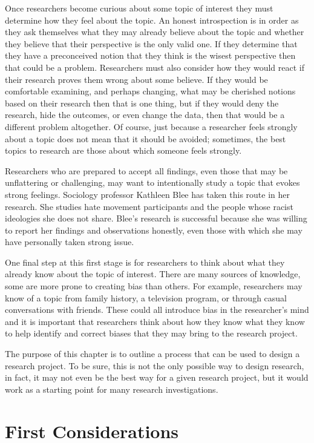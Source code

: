 Once researchers become curious about some topic of interest they must determine how they feel about the topic. An honest introspection is in order as they ask themselves what they may already believe about the topic and whether they believe that their perspective is the only valid one. If they determine that they have a preconceived notion that they think is the wisest perspective then that could be a problem. Researchers must also consider how they would react if their research proves them wrong about some believe. If they would be comfortable examining, and perhaps changing, what may be cherished notions based on their research then that is one thing, but if they would deny the research, hide the outcomes, or even change the data, then that would be a different problem altogether. Of course, just because a researcher feels strongly about a topic does not mean that it should be avoided; sometimes, the best topics to research are those about which someone feels strongly. 

Researchers who are prepared to accept all findings, even those that may be unflattering or challenging, may want to intentionally study a topic that evokes strong feelings. Sociology professor Kathleen Blee\cite{blee2005racial} has taken this route in her research. She studies hate movement participants and the people whose racist ideologies she does not share. Blee's research is successful because she was willing to report her findings and observations honestly, even those with which she may have personally taken strong issue.

One final step at this first stage is for researchers to think about what they already know about the topic of interest. There are many sources of knowledge, some are more prone to creating bias than others. For example, researchers may know of a topic from family history, a television program, or through casual conversations with friends. These could all introduce bias in the researcher's mind and it is important that researchers think about how they know what they know to help identify and correct biases that they may bring to the research project.

The purpose of this chapter is to outline a process that can be used to design a research project. To be sure, this is not the only possible way to design research, in fact, it may not even be the best way for a given research project, but it would work as a starting point for many research investigations.

\section{First Considerations}

